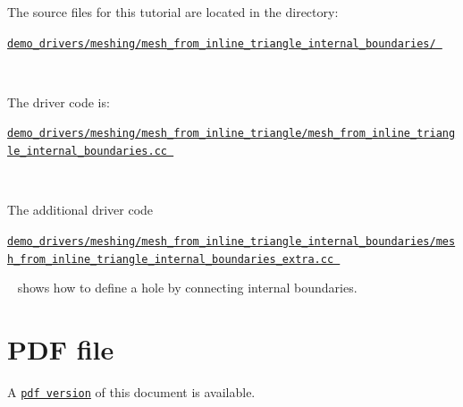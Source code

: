 \begin{DoxyItemize}
\item The source files for this tutorial are located in the directory\+:~\newline
~\newline
\begin{center} \href{../../../../demo_drivers/meshing/mesh_from_triangle/}{\tt demo\+\_\+drivers/meshing/mesh\+\_\+from\+\_\+inline\+\_\+triangle\+\_\+internal\+\_\+boundaries/ } \end{center} ~\newline

\item The driver code is\+: ~\newline
~\newline
\begin{center} \href{../../../../demo_drivers/meshing/mesh_from_inline_triangle_internal_boundaries/mesh_from_inline_triangle_internal_boundaries.cc}{\tt demo\+\_\+drivers/meshing/mesh\+\_\+from\+\_\+inline\+\_\+triangle/mesh\+\_\+from\+\_\+inline\+\_\+triangle\+\_\+internal\+\_\+boundaries.\+cc } \end{center}  ~\newline
~\newline

\item The additional driver code ~\newline
~\newline
\begin{center} \href{../../../../demo_drivers/meshing/mesh_from_inline_triangle_internal_boundaries/mesh_from_inline_triangle_internal_boundaries_extra.cc}{\tt demo\+\_\+drivers/meshing/mesh\+\_\+from\+\_\+inline\+\_\+triangle\+\_\+internal\+\_\+boundaries/mesh\+\_\+from\+\_\+inline\+\_\+triangle\+\_\+internal\+\_\+boundaries\+\_\+extra.\+cc } \end{center}  ~\newline
shows how to define a hole by connecting internal boundaries.
\end{DoxyItemize}



 

 \hypertarget{index_pdf}{}\section{P\+D\+F file}\label{index_pdf}
A \href{../latex/refman.pdf}{\tt pdf version} of this document is available. 
